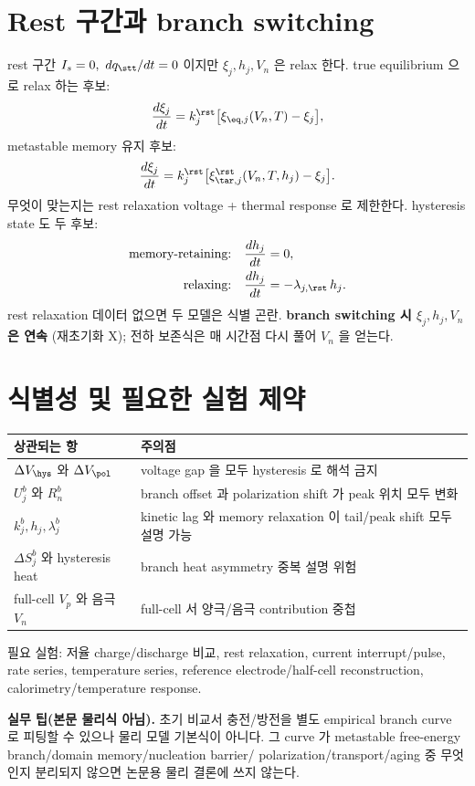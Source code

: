 \section{Rest 구간과 branch switching}\label{sec:ch5_rest}
rest 구간 $I_s=0,\ dq_\stt/dt=0$ 이지만 $\xi_j,h_j,V_n$ 은 relax 한다. true equilibrium 으로 relax 하는 후보:
\begin{equation}
\frac{d\xi_j}{dt}=k_j^\rst\big[\xi_{\eq,j}(V_n,T)-\xi_j\big],
\label{eq:ch5_rest_eq}
\end{equation}
metastable memory 유지 후보:
\begin{equation}
\frac{d\xi_j}{dt}=k_j^\rst\big[\xi_{\tar,j}^\rst(V_n,T,h_j)-\xi_j\big].
\label{eq:ch5_rest_meta}
\end{equation}
무엇이 맞는지는 rest relaxation voltage + thermal response 로 제한한다. hysteresis state 도 두 후보:
\begin{align}
\text{memory-retaining:}\quad &\frac{dh_j}{dt}=0,\label{eq:ch5_h_rest_mem}\\
\text{relaxing:}\quad &\frac{dh_j}{dt}=-\lambda_{j,\rst}\,h_j.\label{eq:ch5_h_rest_relax}
\end{align}
rest relaxation 데이터 없으면 두 모델은 식별 곤란. \textbf{branch switching 시 $\xi_j,h_j,V_n$ 은 연속}
(재초기화 X); 전하 보존식은 매 시간점 다시 풀어 $V_n$ 을 얻는다.

\section{식별성 및 필요한 실험 제약}\label{sec:ch5_ident}
\begin{longtable}{p{} p{}}
\toprule 상관되는 항 & 주의점 \\ \midrule \endhead
$\Delta V_\hys$ 와 $\Delta V_\pol$ & voltage gap 을 모두 hysteresis 로 해석 금지 \\
$U_j^b$ 와 $R_n^b$ & branch offset 과 polarization shift 가 peak 위치 모두 변화 \\
$k_j^b,h_j,\lambda_j^b$ & kinetic lag 와 memory relaxation 이 tail/peak shift 모두 설명 가능 \\
$\Delta S_j^b$ 와 hysteresis heat & branch heat asymmetry 중복 설명 위험 \\
full-cell $V_p$ 와 음극 $V_n$ & full-cell 서 양극/음극 contribution 중첩 \\
\bottomrule
\end{longtable}
필요 실험: 저율 charge/discharge 비교, rest relaxation, current interrupt/pulse, rate series, temperature
series, reference electrode/half-cell reconstruction, calorimetry/temperature response.
\begin{mdframed}
\textbf{실무 팁(본문 물리식 아님).} 초기 비교서 충전/방전을 별도 empirical branch curve 로 피팅할 수 있으나
물리 모델 기본식이 아니다. 그 curve 가 metastable free-energy branch/domain memory/nucleation barrier/
polarization/transport/aging 중 무엇인지 분리되지 않으면 논문용 물리 결론에 쓰지 않는다.
\end{mdframed}

